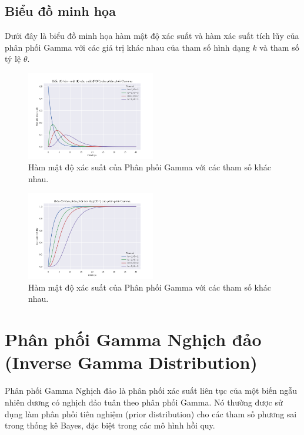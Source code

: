 	\subsection{Biểu đồ minh họa}
	Dưới đây là biểu đồ minh họa hàm mật độ xác suất 
	và hàm xác suất tích lũy của phân phối Gamma với các giá trị khác nhau của tham số hình dạng 
	$k$ và tham số tỷ lệ $\theta$.
	
	\begin{figure}[h!]
		\centering
		\includegraphics[width=0.5\textwidth]{images/Gamma Distribution-PDF.png} %
		\caption{Hàm mật độ xác suất của Phân phối Gamma với các tham số khác nhau.}
		\label{fig:Gamma Distribution-PDF}
	\end{figure}
	\begin{figure}[h!]
		\centering
		\includegraphics[width=0.5\textwidth]{images/Gamma Distribution-CDF.png} %
		\caption{Hàm mật độ xác suất của Phân phối Gamma với các tham số khác nhau.}
		\label{fig:Gamma Distribution-CDF}
	\end{figure}
	

	\newpage
	\section{Phân phối Gamma Nghịch đảo (Inverse Gamma Distribution)}
	Phân phối Gamma Nghịch đảo là phân phối xác suất liên tục của một biến ngẫu nhiên dương có nghịch đảo tuân theo phân phối Gamma. Nó thường được sử dụng làm phân phối tiên nghiệm (prior distribution) cho các tham số phương sai trong thống kê Bayes, đặc biệt trong các mô hình hồi quy.
	
